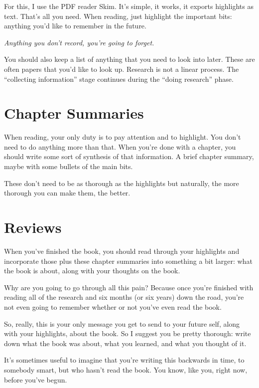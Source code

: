 For this, I use the PDF reader Skim. It's simple, it works, it exports
highlights as text. That's all you need. When reading, just
highlight the important bits: anything you'd like to remember in the future.

\textit{Anything you don't record, you're going to forget.}

You should also keep a list of anything that you need to look into later. These are
often papers that you'd like to look up. Research is not a linear process. The
``collecting information'' stage continues during the ``doing research'' phase.

\section{Chapter Summaries}

When reading, your only duty is to pay attention and to highlight. You don't
need to do anything more than that. When you're done with a chapter, you should
write some sort of synthesis of that information. A brief chapter summary, maybe
with some bullets of the main bits.

These don't need to be as thorough as the highlights but naturally, the more
thorough you can make them, the better.

\section{Reviews}

When you've finished the book, you should read through your highlights
and incorporate those plus these chapter
summaries into something a bit larger: what the book is about, along with your
thoughts on the book.

Why are you going to go through all this pain? Because once you're finished
with reading all of the research and six months (or six years) down the road,
you're not even going to remember whether or not you've even read the book.

So, really, this is your only message you get to send to your future self, along
with your highlights, about the book. So I suggest you be pretty
thorough: write down what the book was about, what you learned, and what you
thought of it.

It's sometimes useful to imagine that you're writing this backwards in time, to
somebody smart, but who hasn't read the book. You know, like you, right now,
before you've begun.

